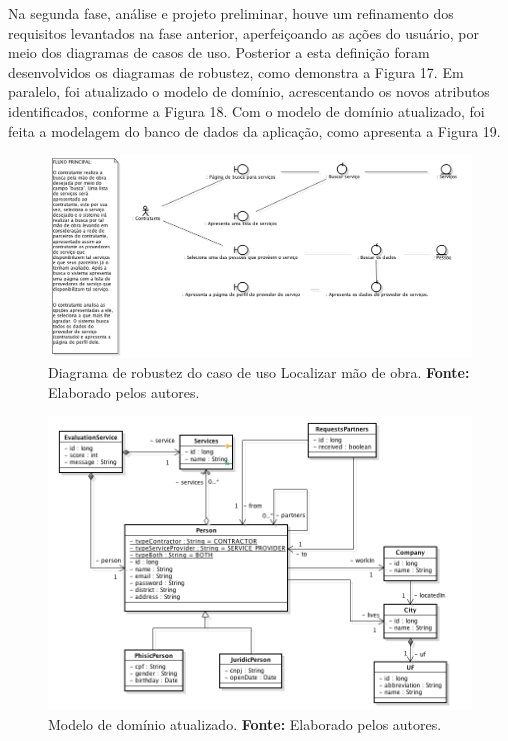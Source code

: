\par Na segunda fase, análise e projeto preliminar, houve um refinamento dos requisitos levantados na fase anterior, aperfeiçoando as ações do usuário, por meio dos diagramas de casos de uso. Posterior a esta definição foram desenvolvidos os diagramas de robustez, como demonstra a Figura 17. Em paralelo, foi atualizado o modelo de domínio, acrescentando os novos atributos identificados, conforme a Figura 18. Com o modelo de domínio atualizado, foi feita a modelagem do banco de dados da aplicação, como apresenta a Figura 19.

\begin{figure}[h!]
	\centerline{\includegraphics[scale=0.35]{./imagens/robustez.png}}
	\caption[Diagrama de robustez do caso de uso Localizar mão de obra]
	{Diagrama de robustez do caso de uso Localizar mão de obra. \textbf{Fonte:} Elaborado pelos autores.}
	\label{fig:exemplo1}
\end{figure}

\begin{figure}[h!]
	\centerline{\includegraphics[scale=0.6]{./imagens/modelo-dominio-com-atributos.png}}
	\caption[Modelo de domínio atualizado]
	{Modelo de domínio atualizado. \textbf{Fonte:} Elaborado pelos autores.}
	\label{fig:exemplo1}
\end{figure} 

